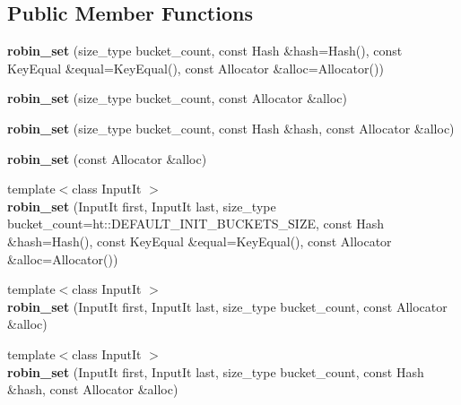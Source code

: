 \subsection*{Public Member Functions}
\begin{DoxyCompactItemize}
\item 
\mbox{\label{classtsl_1_1robin__set_a2244e9c1cdd44e4ff52ea6f77c8ac4c8}} 
{\bfseries robin\+\_\+set} (size\+\_\+type bucket\+\_\+count, const Hash \&hash=Hash(), const Key\+Equal \&equal=Key\+Equal(), const Allocator \&alloc=Allocator())
\item 
\mbox{\label{classtsl_1_1robin__set_aaf2f02ec405d886bf740d6812a232a25}} 
{\bfseries robin\+\_\+set} (size\+\_\+type bucket\+\_\+count, const Allocator \&alloc)
\item 
\mbox{\label{classtsl_1_1robin__set_a64ce804ce882c7b6ad99fbe342cba2bf}} 
{\bfseries robin\+\_\+set} (size\+\_\+type bucket\+\_\+count, const Hash \&hash, const Allocator \&alloc)
\item 
\mbox{\label{classtsl_1_1robin__set_acc606f1ab1714de40574640d8ab4b45e}} 
{\bfseries robin\+\_\+set} (const Allocator \&alloc)
\item 
\mbox{\label{classtsl_1_1robin__set_ad5f2ffb33b7fa2a855ee6fc742b8840e}} 
{\footnotesize template$<$class Input\+It $>$ }\\{\bfseries robin\+\_\+set} (Input\+It first, Input\+It last, size\+\_\+type bucket\+\_\+count=ht\+::\+D\+E\+F\+A\+U\+L\+T\+\_\+\+I\+N\+I\+T\+\_\+\+B\+U\+C\+K\+E\+T\+S\+\_\+\+S\+I\+ZE, const Hash \&hash=Hash(), const Key\+Equal \&equal=Key\+Equal(), const Allocator \&alloc=Allocator())
\item 
\mbox{\label{classtsl_1_1robin__set_a05f4783d8f4573141c52f9a6e91c6d23}} 
{\footnotesize template$<$class Input\+It $>$ }\\{\bfseries robin\+\_\+set} (Input\+It first, Input\+It last, size\+\_\+type bucket\+\_\+count, const Allocator \&alloc)
\item 
\mbox{\label{classtsl_1_1robin__set_a602130e216f8e8ee1da2d1dc359298cb}} 
{\footnotesize template$<$class Input\+It $>$ }\\{\bfseries robin\+\_\+set} (Input\+It first, Input\+It last, size\+\_\+type bucket\+\_\+count, const Hash \&hash, const Allocator \&alloc)

\end{DoxyCompactItemize}
